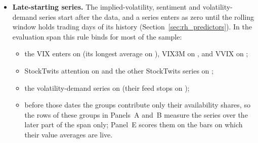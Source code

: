 \begin{itemize}
  three.
  \begin{itemize}
  \item The semivariance HAR of \citet{PattonSheppard2015} adds the positive and negative realized semivariances
    $\mathrm{RS}^{\pm}$ of the last half hour; the negative semivariance is $\mathrm{RS}^{-} = \RV - \mathrm{RS}^{+}$,
    exact on every bar of the data.
  \item The HARQ model of \citet{BollerslevPattonQuaedvlieg2016} adds the interaction of the last half hour's realized
    variance with the square root of its realized quarticity $\mathrm{RQ} = (N/3)\sum_k r^4_{t,i,k}$ (in the
    volatility units of the design, $\sqrt{\RV\,\mathrm{RQ}^{1/2}}$).
  \item The leverage HAR of \citet{CorsiReno2012} adds the negative part of the half-hour return, $\min(r_{t,i}, 0)$,
    at every HAR horizon.
  \end{itemize}
\item \textbf{Late-starting series.} The implied-volatility, sentiment and volatility-demand series start after the
  data, and a series enters as zero until the rolling window holds \rhorWindowDays{} trading days of its history
  (Section~\ref{sec:rh_predictors}). In the evaluation span this rule binds for most of the sample:
  \begin{itemize}
  \item the VIX enters on \rhabLiveVixFromKone{} (its longest average on \rhabLiveVixFromKlast), VIX3M on
    \rhabLiveVixthreemFromKone, and VVIX on \rhabLiveVvixFromKone;
  \item StockTwits attention on \rhabLiveAttnFromKone{} and the other StockTwits series on \rhabLiveSentFromKone;
  \item the volatility-demand series on \rhabLiveVdSpxOcFromKone{} (their feed stops on \rhabLiveVdSpxOcLast);
  \item before those dates the groups contribute only their availability shares, so the rows of these groups in
    Panels~A and~B measure the series over the later part of the span only; Panel~E scores them on the bars on which
    their value averages are live.
  \end{itemize}
\end{itemize}


